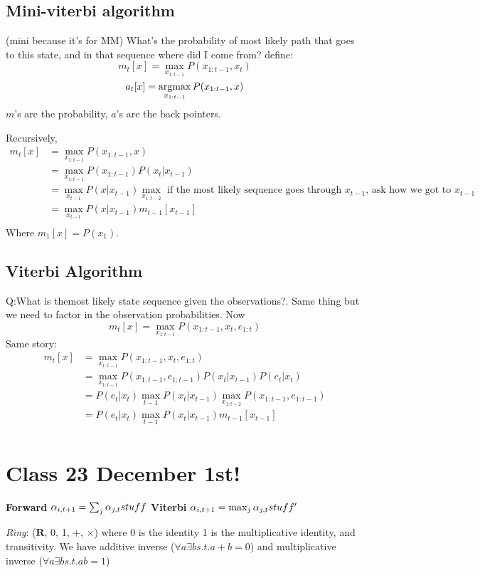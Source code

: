\subsection{Mini-viterbi algorithm} (mini because it's for MM)
What's the probability of most likely path that goes to this state,
and in that sequence where did I come from?
define: $$m_t[x] = \max_{x_{1:t-1}}P(x_{1:t-1}, x_t)$$
$$a_t[x]=\argmax_{x_{1:t-1}}P(x_{1:t-1}, x)$$
$m$'s are the probability, $a$'s are the back pointers.

Recursively, 
\begin{align*}
  m_t[x] &= \max_{x_{1:t-1}}P(x_{1:t-1}, x)\\
&=\max_{x_{1:t-1}}P(x_{1:t-1})P(x_t|x_{t-1})\\
&=\max_{x_{t-1}}P(x|x_{t-1})\max_{x_{1:t-2}} \text{ if the most likely
sequence goes through $x_{t-1}$, ask how we got to $x_{t-1}$ }\\
&=\max_{x_{t-1}}P(x|x_{t-1})m_{t-1}[x_{t-1}]\\
\end{align*}
Where $m_1[x] = P(x_1)$.

\subsection{Viterbi Algorithm}
Q:What is themost likely state sequence given the observations?. Same
thing but we need to factor in the observation probabilities.
Now $$m_t[x] = \max_{x_{1:t-1}}P(x_{1:t-1}, x_t, e_{1:t})$$
Same story:
\begin{align*}
  m_t[x] &=\max_{x_{1:t-1}}P(x_{1:t-1}, x_t, e_{1:t})\\
&=\max_{x_{1:t-1}}P(x_{1:t-1}, e_{1:t-1})P(x_t|x_{t-1})P(e_t|x_t)\\
&=P(e_t|x_t)\max_{t-1}P(x_t|x_{t-1})\max_{x_{1:t-2}}P(x_{1:t-1},
e_{1:t-1})\\
&=P(e_t|x_t)\max_{t-1}P(x_t|x_{t-1})m_{t-1}[x_{t-1}]\\
\end{align*}

\pagebreak
\section{Class 23 December 1st!}
\textbf{Forward} $\alpha_{i,t+1} = \sum_j \alpha_{j,t}stuff$
\textbf{Viterbi} $\alpha_{i,t+1} = \max_j \alpha_{j,t}stuff'$

\emph{Ring}: ($\textbf{R}$, 0, 1, +, $\times$) where 0 is the identity
1 is the multiplicative identity, and transitivity. 
We have additive inverse ($\forall a \exists b s.t. a+b = 0$) and
multiplicative inverse ($\forall a \exists b s.t. ab = 1$)


